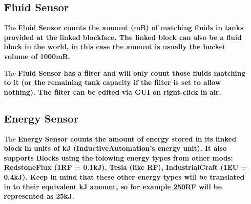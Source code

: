 \documentclass[11pt]{article} %
\begin{document}
\subsection{Fluid Sensor}
The \bf Fluid Sensor \rm counts the amount (mB) of matching fluids in tanks provided at the linked blockface. The linked block can also be a fluid block in the world, in this case the amount is usually the bucket volume of 1000mB.

The \bf  Fluid Sensor \rm has a filter and will only count those fluids matching to it (or the remaining tank capacity if the filter is set to allow nothing). The filter can be edited via GUI on right-click in air.

\subsection{Energy Sensor}
The \bf Energy Sensor \rm counts the amount of energy stored in its linked block in units of kJ (InductiveAutomation's energy unit). It also supports Blocks using the folowing energy types from other mods: RedstoneFlux (1RF = 0.1kJ), Tesla (like RF), IndustrialCraft (1EU = 0.4kJ). Keep in mind that these other energy types will be translated in to their equivalent kJ amount, so for example 250RF will be represented as 25kJ.
\end{document}
